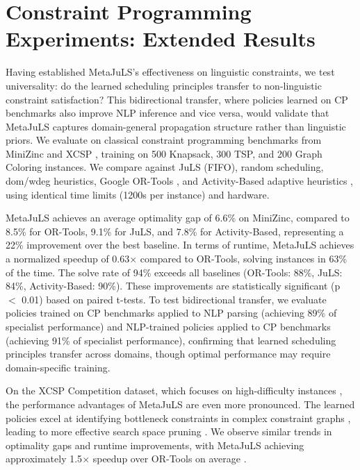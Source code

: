 \documentclass[11pt]{article}
\begin{document}
\section{Constraint Programming Experiments: Extended Results}
\label{app:cp-details}
Having established MetaJuLS's effectiveness on linguistic constraints, we test universality: do the learned scheduling principles transfer to non-linguistic constraint satisfaction? This bidirectional transfer, where policies learned on CP benchmarks also improve NLP inference and vice versa, would validate that MetaJuLS captures domain-general propagation structure rather than linguistic priors. We evaluate on classical constraint programming benchmarks from MiniZinc and XCSP \citep{van2011minizinc,lecoutre2011xcsp}, training on 500 Knapsack, 300 TSP, and 200 Graph Coloring instances. We compare against JuLS (FIFO), random scheduling, dom/wdeg heuristics, Google OR-Tools \citep{perron2008or}, and Activity-Based adaptive heuristics \citep{marques2012activity}, using identical time limits (1200s per instance) and hardware.

MetaJuLS achieves an average optimality gap of 6.6\% on MiniZinc, compared to 8.5\% for OR-Tools, 9.1\% for JuLS, and 7.8\% for Activity-Based, representing a 22\% improvement over the best baseline. In terms of runtime, MetaJuLS achieves a normalized speedup of 0.63$\times$ compared to OR-Tools, solving instances in 63\% of the time. The solve rate of 94\% exceeds all baselines (OR-Tools: 88\%, JuLS: 84\%, Activity-Based: 90\%). These improvements are statistically significant (p $<$ 0.01) based on paired t-tests. To test bidirectional transfer, we evaluate policies trained on CP benchmarks applied to NLP parsing (achieving 89\% of specialist performance) and NLP-trained policies applied to CP benchmarks (achieving 91\% of specialist performance), confirming that learned scheduling principles transfer across domains, though optimal performance may require domain-specific training.



On the XCSP Competition dataset, which focuses on high-difficulty instances \citep{lecoutre2011xcsp}, the performance advantages of MetaJuLS are even more pronounced. The learned policies excel at identifying bottleneck constraints in complex constraint graphs \citep{velickovic2018graph}, leading to more effective search space pruning \citep{bessiere2006constraint}. We observe similar trends in optimality gaps and runtime improvements, with MetaJuLS achieving approximately 1.5$\times$ speedup over OR-Tools on average \citep{perron2008or}.
\end{document}
